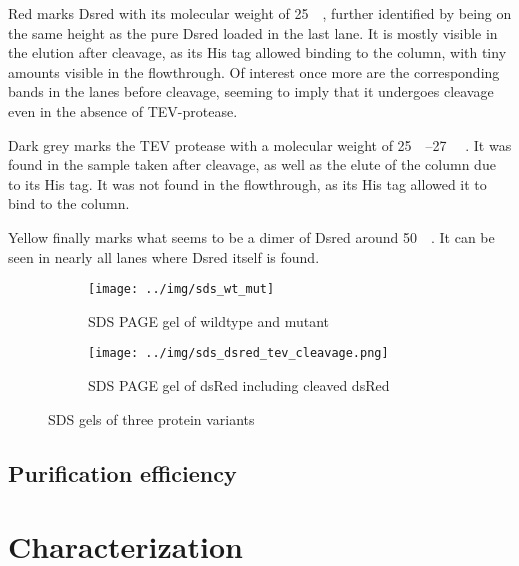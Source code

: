 Red marks Dsred with its molecular weight of \SI{25}{\kilo\Da}, further
identified by being on the same height as the pure Dsred loaded in the last
lane. It is mostly visible in the elution after cleavage, as its His tag
allowed binding to the column, with tiny amounts visible in the flowthrough. Of
interest once more are the corresponding bands in the lanes before cleavage,
seeming to imply that it undergoes cleavage even in the absence of
TEV-protease.

Dark grey marks the TEV protease with a molecular weight of
\SIrange{25}{27}{\kilo\Da} \cite{pdb}. It was found in the sample taken after
cleavage, as well as the elute of the column due to its His tag. It was not
found in the flowthrough, as its His tag allowed it to bind to the column.

Yellow finally marks what seems to be a dimer of Dsred around
\SI{50}{\kilo\Dalton}. It can be seen in nearly all lanes where Dsred itself is
found.

\begin{figure}
    \centering
    \begin{subfigure}{0.8\textwidth}
        \texttt{[image: ../img/sds\_wt\_mut]}
        \caption{SDS PAGE gel of wildtype and mutant}
        \label{fig:sds_wt_mut}
    \end{subfigure}

    \begin{subfigure}{0.8\textwidth}
        \texttt{[image: ../img/sds\_dsred\_tev\_cleavage.png]}
        \caption{SDS PAGE gel of dsRed including cleaved dsRed}
        \label{fig:sds_dsred_cleaved}
    \end{subfigure}
    \caption{SDS gels of three protein variants}
    \label{fig:sds}
\end{figure}

\subsection{Purification efficiency}


\section{Characterization}

